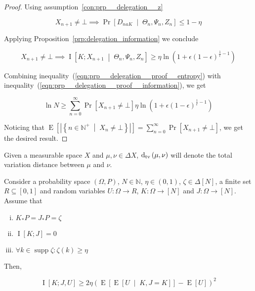 \documentclass[anon,12pt]{colt2018} %
\DeclareMathOperator{\Supp}{supp}
\newcommand{\AP}[1]{\left(#1\right)}
\newcommand{\AB}[1]{\left[#1\right]}
\newcommand{\ABM}[2]{\left[#1\;\middle\vert\;#2\right]}
\newcommand{\ACM}[2]{\left\{#1\;\middle\vert\;#2\right\}}
\newcommand{\Pa}[2]{\underset{#1}{\operatorname{Pr}}\AB{#2}}
\newcommand{\CP}[3]{\underset{#1}{\operatorname{Pr}}\ABM{#2}{#3}}
\newcommand{\Ea}[2]{\underset{#1}{\operatorname{E}}\AB{#2}}
\newcommand{\CE}[3]{\underset{#1}{\operatorname{E}}\ABM{#2}{#3}}
\newcommand{\CI}[3]{\underset{#1}{\operatorname{I}}\ABM{#2}{#3}}
\newcommand{\Ia}[2]{\underset{#1}{\operatorname{I}}\AB{#2}}
\newcommand{\Dtva}[1]{\operatorname{d}_{\textnormal{tv}}\AP{#1}}
\newcommand{\Nats}{\mathbb{N}}
\newcommand{\Abs}[1]{\left\vert #1 \right\vert}
\begin{document}
\begin{proof}
Using assumption~\ref{con:prp__delegation__z}

\[X_{n+1} \ne \bot \implies \CP{}{D_{naK}}{\Theta_n,\Psi_n,Z_n} \leq 1 - \eta\]


Applying Proposition~\ref{prp:delegation_information} we conclude

\begin{equation}
\label{eqn:prp__delegation__proof__information}
X_{n+1} \ne \bot \implies \CI{}{K;X_{n+1}}{\Theta_n,\Psi_n,Z_n} \geq \eta \ln\left(1 + \epsilon(1-\epsilon)^{\frac{1}{\epsilon}-1}\right)
\end{equation}

Combining inequality~(\ref{eqn:prp__delegation__proof__entropy}) with inequality~(\ref{eqn:prp__delegation__proof__information}), we get

\[\ln{N} \geq \sum_{n=0}^\infty \Pa{}{X_{n+1}\ne\bot}\eta \ln\left(1 + \epsilon(1-\epsilon)^{\frac{1}{\epsilon}-1}\right)\]

Noticing that $\Ea{}{\Abs{\ACM{n\in\Nats^+}{X_n\ne\bot}}}=\sum_{n=0}^{\infty}\Pa{}{X_{n+1}\ne\bot}$, we get the desired result.
\end{proof}

Given a measurable space $X$ and $\mu,\nu\in\Delta X$, $\Dtva{\mu,\nu}$ will denote the total variation distance between $\mu$ and $\nu$.

\begin{samepage}
\begin{proposition}
\label{prp:thompson}

Consider a probability space $(\Omega, P)$, $N \in \Nats$, $\eta\in(0,1)$, $\zeta\in\Delta[N]$, a finite set $R \subseteq [0,1]$ and random variables $U: \Omega \rightarrow R$, $K: \Omega \rightarrow [N]$ and $J: \Omega \rightarrow [N]$. Assume that

\begin{enumerate}[i.]

\item\label{con:prp__thompson__distribution}$K_*P = J_*P = \zeta$
\item\label{con:prp__thompson__independent}$\Ia{}{K;J} = 0$
\item\label{con:prp__thompson__eta}$\forall k \in \Supp{\zeta}: \zeta(k) \geq \eta$

\end{enumerate}

Then,

\begin{equation}
\Ia{}{K;J,U} \geq 2 \eta \AP{\Ea{}{\CE{}{U}{K,J = K}}-\Ea{}{U}}^2
\end{equation}

\end{proposition}
\end{samepage}
\end{document}
